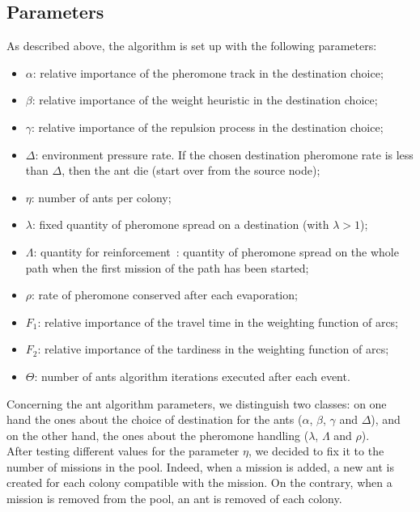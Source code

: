 \documentclass[a4paper,10pt]{article}
\begin{document}
\subsection{Parameters}
As described above, the algorithm is set up with the following parameters:

\begin{itemize}
 \item $\alpha$: relative importance of the pheromone track in the destination choice;
 \item $\beta$:  relative importance of the weight heuristic in the destination choice;
 \item $\gamma$: relative importance of the repulsion process in the destination choice;
 \item $\Delta$: environment pressure rate. If the chosen destination pheromone rate is less than $\Delta$, then the ant die (start over from the source node);
 \item $\eta$: number of ants per colony;
 \item $\lambda$: fixed quantity of pheromone spread on a destination (with $\lambda > 1$);
 \item $\Lambda$: quantity for reinforcement : quantity of pheromone spread on the whole path when the first mission of the path has been started;
 \item $\rho$: rate of pheromone conserved after each evaporation;
 \item $F_1$: relative importance of the travel time in the weighting function of arcs;
 \item $F_2$: relative importance of the tardiness in the weighting function of arcs;
 \item $\Theta$: number of ants algorithm iterations executed after each event.
\end{itemize}

Concerning the ant algorithm parameters, we distinguish two classes: on one hand the ones about the choice of destination for the ants ($\alpha$, $\beta$, $\gamma$ and $\Delta$), and on the other hand, the ones about the pheromone handling ($\lambda$, $\Lambda$ and $\rho$).\\

After testing different values for the parameter $\eta$, we decided to fix it to the number of missions in the pool. Indeed, when a mission is added, a new ant is created for each colony compatible with the mission. On the contrary, when a mission is removed from the pool, an ant is removed of each colony.\\
\end{document}
